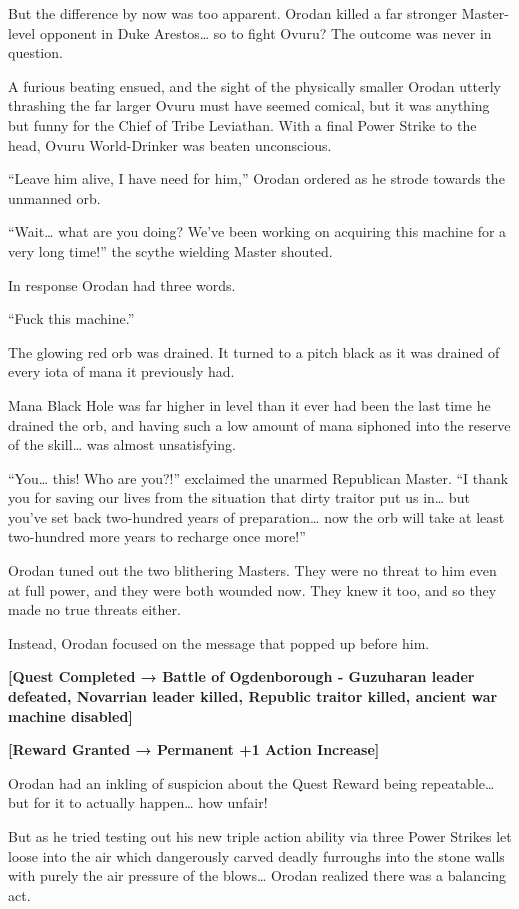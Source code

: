 \documentclass[a4paper,10pt]{book}
\begin{document}
But the difference by now was too apparent. Orodan killed a far stronger Master-level opponent in Duke Arestos… so to fight Ovuru? The outcome was never in question.\par
A furious beating ensued, and the sight of the physically smaller Orodan utterly thrashing the far larger Ovuru must have seemed comical, but it was anything but funny for the Chief of Tribe Leviathan. With a final Power Strike to the head, Ovuru World-Drinker was beaten unconscious.\par
“Leave him alive, I have need for him,” Orodan ordered as he strode towards the unmanned orb.\par
“Wait… what are you doing? We’ve been working on acquiring this machine for a very long time!” the scythe wielding Master shouted.\par
In response Orodan had three words.\par
“Fuck this machine.”\par
The glowing red orb was drained. It turned to a pitch black as it was drained of every iota of mana it previously had.\par
Mana Black Hole was far higher in level than it ever had been the last time he drained the orb, and having such a low amount of mana siphoned into the reserve of the skill… was almost unsatisfying.\par
“You… this! Who are you?!” exclaimed the unarmed Republican Master. “I thank you for saving our lives from the situation that dirty traitor put us in… but you’ve set back two-hundred years of preparation… now the orb will take at least two-hundred more years to recharge once more!”\par
Orodan tuned out the two blithering Masters. They were no threat to him even at full power, and they were both wounded now. They knew it too, and so they made no true threats either.\par
Instead, Orodan focused on the message that popped up before him.\par
\textbf{[Quest Completed → Battle of Ogdenborough - Guzuharan leader defeated, Novarrian leader killed, Republic traitor killed, ancient war machine disabled]}\par
\textbf{[Reward Granted → Permanent +1 Action Increase]}\par
Orodan had an inkling of suspicion about the Quest Reward being repeatable… but for it to actually happen… how unfair!\par
But as he tried testing out his new triple action ability via three Power Strikes let loose into the air which dangerously carved deadly furroughs into the stone walls with purely the air pressure of the blows… Orodan realized there was a balancing act.\par
\end{document}
